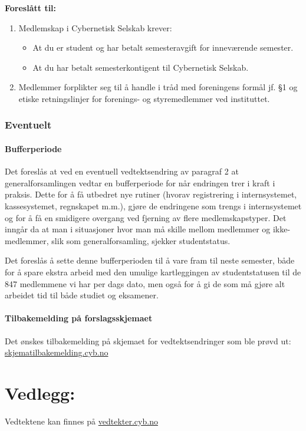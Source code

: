 \documentclass[10pt,norsk,a4paper,usenames,dvipsnames]{article}
\begin{document}
        \textbf{Foreslått til:}
        \begin{enumerate} 
        	\item{Medlemskap i Cybernetisk Selskab krever:}
        	\begin{itemize}
        		\item{At du er student og har betalt semesteravgift for inneværende semester.}
        		\item{At du har betalt semesterkontigent til Cybernetisk Selskab.}
        	\end{itemize}
        	\item Medlemmer forplikter seg til å handle i tråd med foreningens formål jf. §1 og etiske retningslinjer for forenings- og styremedlemmer ved instituttet.
        \end{enumerate}
        

\section{Eventuelt}
    \subsection{Bufferperiode}
        Det foreslås at ved en eventuell vedtektsendring av paragraf 2 at generalforsamlingen vedtar en bufferperiode for når endringen trer i kraft i praksis. Dette for å få utbedret nye rutiner (hvorav registrering i internsystemet, kassesystemet, regnskapet m.m.), gjøre de endringene som trengs i internsystemet og for å få en smidigere overgang ved fjerning av flere medlemskapstyper. Det inngår da at man i situasjoner hvor man må skille mellom medlemmer og ikke-medlemmer, slik som generalforsamling, sjekker studentstatus.
        
        Det foreslås å sette denne bufferperioden til å vare fram til neste semester, både for å spare ekstra arbeid med den umulige kartleggingen av studentstatusen til de 847 medlemmene vi har per dags dato, men også for å gi de som må gjøre alt arbeidet tid til både studiet og eksamener.
    
    \subsection{Tilbakemelding på forslagsskjemaet}
        Det ønskes tilbakemelding på skjemaet for vedtektsendringer som ble prøvd ut:
        \href{skjematilbakemelding.cyb.no}{skjematilbakemelding.cyb.no}




\part*{Vedlegg:}\label{lastpage}

    \centering\huge Vedtektene kan finnes på \href{vedtekter.cyb.no}{vedtekter.cyb.no}
    

% 
\end{document}
